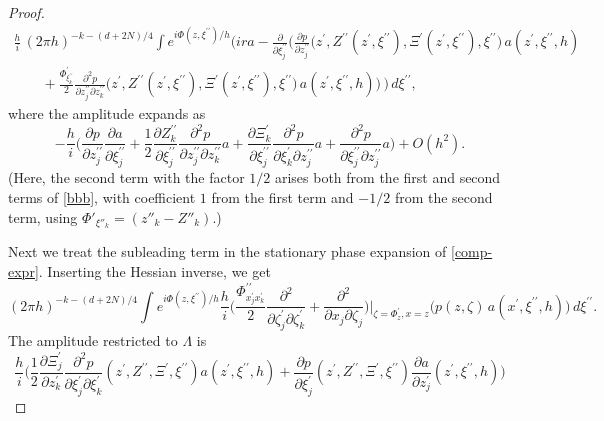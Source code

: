\documentclass[10pt, a4paper, twoside]{amsart}
\numberwithin{equation}{section}
\theoremstyle{remark}
\begin{document}
\begin{appendix}
\begin{proof}
	 \begin{equation}\begin{gathered} \frac{h}{i}  \,   (2 \pi h)^{- k  - (d + 2N)/4} \int e^{i\Phi(z, \xi^{\prime\prime})/h}  \Bigg( i r a - \frac{\partial}{\partial \xi^{\prime\prime}_j}\bigg( \frac{\partial p}{\partial z^{\prime\prime}_j}  \big(z^\prime, Z^{\prime\prime}(z^\prime, \xi^{\prime\prime}), \Xi^\prime(z^\prime, \xi^{\prime\prime}), \xi^{\prime\prime}\big) \, a(z^\prime, \xi^{\prime\prime}, h)  \\  \quad \quad + \frac{\Phi_{\xi^{\prime\prime}_k}^\prime}{2} \frac{\partial^2 p}{\partial z_j^{\prime\prime} \partial z_k^{\prime\prime}}   \big(z^\prime, Z^{\prime\prime}(z^\prime, \xi^{\prime\prime}), \Xi^\prime(z^\prime, \xi^{\prime\prime}), \xi^{\prime\prime}\big) \, a(z^\prime, \xi^{\prime\prime}, h)\bigg) \, \Bigg) \,  d\xi^{\prime\prime},\end{gathered}\label{bbb}\end{equation}
	where the amplitude expands as 
	\begin{equation}\label{leading integral 2} - \frac{h}{i} \bigg(\frac{\partial p}{\partial z^{\prime\prime}_j} \frac{\partial a}{\partial \xi^{\prime\prime}_j} + \frac{1}{2} \frac{\partial Z^{\prime\prime}_k}{\partial \xi^{\prime\prime}_j} \frac{\partial^2 p}{\partial z^{\prime\prime}_j \partial z^{\prime\prime}_k} a  + \frac{\partial \Xi^\prime_k}{\partial \xi^{\prime\prime}_j}\frac{\partial^2 p}{\partial \xi^\prime_k \partial z^{\prime\prime}_j} a + \frac{\partial^2 p}{\partial \xi^{\prime\prime}_j \partial z^{\prime\prime}_j} a\bigg) + O(h^2).\end{equation}
	(Here, the second term with the factor $1/2$ arises both from the first and second terms of \eqref{bbb}, with coefficient $1$ from the first term and $-1/2$ from the second term, using $\Phi'_{\xi''_k} = (z''_k - Z''_k)$.)
	
	Next we treat the subleading term in the stationary phase expansion of \eqref{comp-expr}. 
	Inserting the Hessian inverse, we get  $$(2 \pi h)^{- k - (d + 2N)/4} \int e^{i \Phi(z, \xi^{\prime\prime})/h} \frac{h}{i} \bigg( \frac{\Phi^{\prime\prime}_{x_j^\prime x_k^\prime}}{2} \frac{\partial^2}{\partial \zeta_j^\prime \partial \zeta_k^\prime} + \frac{\partial^2 }{\partial x_j \partial \zeta_j}\bigg)\bigg|_{\zeta = \Phi^\prime_z, x = z} \big(p(z, \zeta)\, a(x^\prime, \xi^{\prime\prime}, h)\big) \, d\xi^{\prime\prime}.$$ The amplitude restricted to $\Lambda$ is \begin{equation}\label{subleading integral} \frac{h}{i} \bigg(\frac{1}{2} \frac{\partial \Xi^\prime_j}{\partial z^\prime_k} \frac{\partial^2 p}{\partial \xi^{\prime}_j \partial \xi^{\prime}_k} (z^\prime, Z^{\prime\prime}, \Xi^\prime, \xi^{\prime\prime}) a(z^\prime, \xi^{\prime\prime}, h) + \frac{\partial p}{\partial \xi_j^\prime}(z^\prime, Z^{\prime\prime}, \Xi^\prime, \xi^{\prime\prime})  \frac{\partial a}{\partial z_j^\prime}(z^\prime, \xi^{\prime\prime}, h) \bigg) \end{equation}
	

\end{proof}
\end{appendix}
\end{document}
